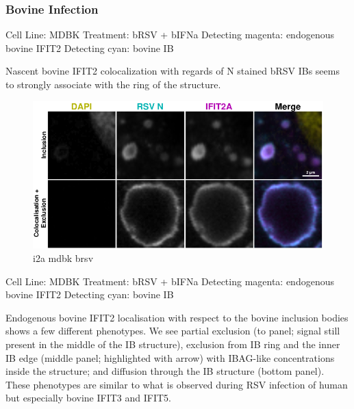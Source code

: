 \subsubsection{Bovine Infection}
Cell Line: MDBK \newline
Treatment: bRSV + bIFNa \newline
Detecting magenta: endogenous bovine IFIT2  \newline
Detecting cyan: bovine IB \newline

Nascent bovine IFIT2 colocalization with regards of N stained bRSV IBs seems to strongly associate with the ring of the structure.

\begin{figure}
    \centering
    \includegraphics[width=1\linewidth]{10. Chapter 5/Figs/01. Infection/08. i2a mdbk brsv.pdf}
    \caption[i2a mdbk brsv]{i2a mdbk brsv}
    \label{fig:i2a mdbk brsv}
\end{figure}

Cell Line: MDBK \newline
Treatment: bRSV + bIFNa \newline
Detecting magenta: endogenous bovine IFIT2  \newline
Detecting cyan: bovine IB \newline

Endogenous bovine IFIT2 localisation with respect to the bovine inclusion bodies shows a few different phenotypes. We see partial exclusion (to panel; signal still present in the middle of the IB structure), exclusion from IB ring and the inner IB edge (middle panel; highlighted with arrow) with IBAG-like concentrations inside the structure; and diffusion through the IB structure (bottom panel). These phenotypes are similar to what is observed during RSV infection of human but especially bovine IFIT3 and IFIT5.

